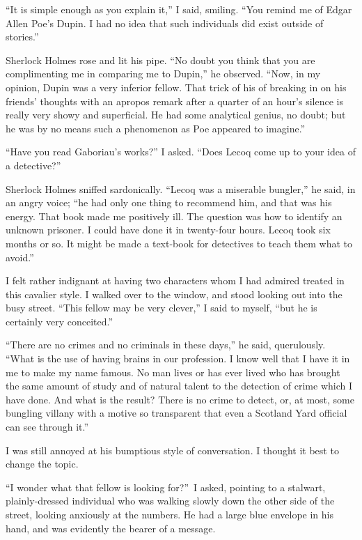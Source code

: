 \documentclass[12pt,english,oneside]{book}
\begin{document}
{}``It is simple enough as you explain it,'' I said, smiling. {}``You
remind me of Edgar Allen Poe's Dupin. I had no idea that such individuals
did exist outside of stories.''

Sherlock Holmes rose and lit his pipe. {}``No doubt you think that
you are complimenting me in comparing me to Dupin,'' he observed.
{}``Now, in my opinion, Dupin was a very inferior fellow. That trick
of his of breaking in on his friends' thoughts with an apropos remark
after a quarter of an hour's silence is really very showy and superficial.
He had some analytical genius, no doubt; but he was by no means such
a phenomenon as Poe appeared to imagine.''

{}``Have you read Gaboriau's works?'' I asked. {}``Does Lecoq come
up to your idea of a detective?''

Sherlock Holmes sniffed sardonically. {}``Lecoq was a miserable bungler,''
he said, in an angry voice; {}``he had only one thing to recommend
him, and that was his energy. That book made me positively ill. The
question was how to identify an unknown prisoner. I could have done
it in twenty-four hours. Lecoq took six months or so. It might be
made a text-book for detectives to teach them what to avoid.''

I felt rather indignant at having two characters whom I had admired
treated in this cavalier style. I walked over to the window, and stood
looking out into the busy street. {}``This fellow may be very clever,''
I said to myself, {}``but he is certainly very conceited.''

{}``There are no crimes and no criminals in these days,'' he said,
querulously. {}``What is the use of having brains in our profession.
I know well that I have it in me to make my name famous. No man lives
or has ever lived who has brought the same amount of study and of
natural talent to the detection of crime which I have done. And what
is the result? There is no crime to detect, or, at most, some bungling
villany with a motive so transparent that even a Scotland Yard official
can see through it.''

I was still annoyed at his bumptious style of conversation. I thought
it best to change the topic.

{}``I wonder what that fellow is looking for?''\ I asked, pointing
to a stalwart, plainly-dressed individual who was walking slowly down
the other side of the street, looking anxiously at the numbers. He
had a large blue envelope in his hand, and was evidently the bearer
of a message.
\end{document}
